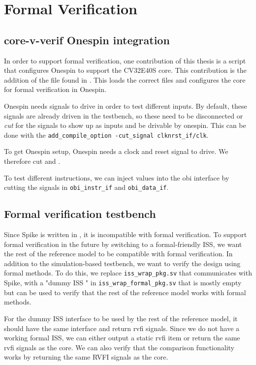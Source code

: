 \chapter{Formal Verification}
\label{ch:formal}

\section{core-v-verif Onespin integration}

In order to support formal verification, one contribution of this thesis is a script that configures Onespin \cite{onespinsolutionsgmbhUserManualOneSpin} to support the CV32E40S core. This contribution is the addition of the file  found in . This loads the correct files and configures the core for formal verification in Onespin. 

Onespin needs signals to drive in order to test different inputs. By default, these signals are already driven in the testbench, so these need to be disconnected or \textit{cut} for the signals to show up as inputs and be drivable by onespin. This can be done with the \lstinline{add_compile_option -cut_signal clknrst_if/clk}.

To get Onespin setup, Onespin needs a clock and reset signal to drive. We therefore cut  and .


To test different instructions, we can inject values into the obi interface by cutting the signals in \lstinline{obi_instr_if} and \lstinline{obi_data_if}.


\section{Formal verification testbench}
\label{sec:formal_testbench}
\label{sec:formal_dummy}

Since Spike is written in \cpp, it is incompatible with formal verification. To support formal verification in the future by switching to a formal-friendly ISS, we want the rest of the reference model to be compatible with formal verification. In addition to the simulation-based testbench, we want to verify the design using formal methods. To do this, we replace \lstinline{iss_wrap_pkg.sv} that communicates with Spike, with a "dummy ISS " in \lstinline{iss_wrap_formal_pkg.sv} that is mostly empty but can be used to verify that the rest of the reference model works with formal methods.

For the dummy ISS interface to be used by the rest of the reference model, it should have the same interface and return \acrshort{rvfi} signals. Since we do not have a working formal ISS, we can either output a static \acrshort{rvfi} item or return the same \acrshort{rvfi} signals as the core. We can also verify that the comparison functionality works by returning the same RVFI signals as the core.


